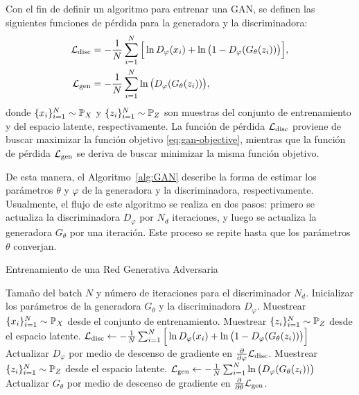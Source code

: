 
Con el fin de definir un algoritmo para entrenar una GAN, se definen las siguientes funciones de pérdida para la generadora y la discriminadora:
\begin{align}
    \cL_{\mathrm{disc}} & = -\frac{1}{N}\sum_{i=1}^{N} \Big[ \ln D_\varphi(x_i) + \ln \qty\big(1 - D_\varphi(G_\theta(z_i))) \Big], \\
    \cL_{\mathrm{gen}}  & = - \frac{1}{N}\sum_{i=1}^{N} \ln \qty\big(D_\varphi(G_\theta(z_i))),
\end{align}
donde $\{x_i\}_{i=1}^{N} \sim \Prob_X$ y $\{z_i\}_{i=1}^{N} \sim \Prob_Z$ son muestras del conjunto de entrenamiento y del espacio latente, respectivamente. La función de pérdida $\mathcal{L}_{\mathrm{disc}}$ proviene de buscar maximizar la función objetivo \eqref{eq:gan-objective}, mientras que la función de pérdida $\mathcal{L}_{\mathrm{gen}}$ se deriva de buscar minimizar la misma función objetivo.

De esta manera, el Algoritmo~\ref*{alg:GAN} describe la forma de estimar los parámetros $\theta$ y $\varphi$ de la generadora y la discriminadora, respectivamente. Usualmente, el flujo de este algoritmo se realiza en dos pasos: primero se actualiza la discriminadora $D_\varphi$ por $N_d$ iteraciones, y luego se actualiza la generadora $G_\theta$ por una iteración. Este proceso se repite hasta que los parámetros $\theta$ converjan.

\begin{algorithm}[H]
    \caption{Entrenamiento de una Red Generativa Adversaria \cite{goodfellow2014generative}}\label{alg:GAN}
    \begin{algorithmic}[1]
        \Require Tamaño del batch $N$ y número de iteraciones para el discriminador $N_d$.
        \State Inicializar los parámetros de la generadora $G_\theta$ y la discriminadora $D_\varphi$.
        \State Muestrear $\{x_i\}_{i=1}^{N} \sim \Prob_X$ desde el conjunto de entrenamiento.
        \State Muestrear $\{z_i\}_{i=1}^{N} \sim \Prob_Z$ desde el espacio latente.
        \State $\cL_{\mathrm{disc}} \gets -\frac{1}{N}\sum_{i=1}^{N} \Big[ \ln D_\varphi(x_i) + \ln \qty\big(1 - D_\varphi(G_\theta(z_i))) \Big]$
        \State Actualizar $D_\varphi$ por medio de descenso de gradiente en $\pdv{\varphi} \cL_{\mathrm{disc}}$.
        \EndFor
        \State Muestrear $\{z_i\}_{i=1}^{N} \sim \Prob_Z$ desde el espacio latente.
        \State $\cL_{\mathrm{gen}} \gets - \frac{1}{N}\sum_{i=1}^{N} \ln \qty\big(D_\varphi(G_\theta(z_i)))$
        \State Actualizar $G_\theta$ por medio de descenso de gradiente en $\pdv{\theta} \mathcal{L}_{\mathrm{gen}}$.
        \EndWhile
    \end{algorithmic}
\end{algorithm}

